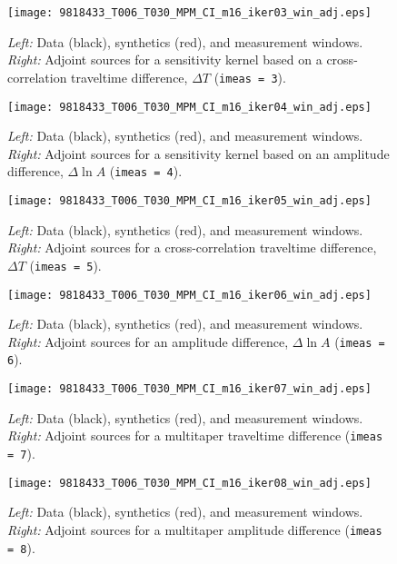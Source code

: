 \documentclass[11pt,titlepage,fleqn]{article}
\begin{document}
\begin{figure}
\texttt{[image: 9818433\_T006\_T030\_MPM\_CI\_m16\_iker03\_win\_adj.eps]}
\caption[]
{{
{\em Left:} Data (black), synthetics (red), and measurement windows.
{\em Right:} Adjoint sources for a sensitivity kernel based on a cross-correlation traveltime difference, $\Delta T$ ({\tt imeas = 3}).
\label{fig:iker03}
}}
\end{figure}


\begin{figure}
\texttt{[image: 9818433\_T006\_T030\_MPM\_CI\_m16\_iker04\_win\_adj.eps]}
\caption[]
{{
{\em Left:} Data (black), synthetics (red), and measurement windows.
{\em Right:} Adjoint sources for a sensitivity kernel based on an amplitude difference, $\Delta \ln A$ ({\tt imeas = 4}).
\label{fig:iker04}
}}
\end{figure}

\begin{figure}
\texttt{[image: 9818433\_T006\_T030\_MPM\_CI\_m16\_iker05\_win\_adj.eps]}
\caption[]
{{
{\em Left:} Data (black), synthetics (red), and measurement windows.
{\em Right:} Adjoint sources for a cross-correlation traveltime difference, $\Delta T$ ({\tt imeas = 5}).
\label{fig:iker05}
}}
\end{figure}

\begin{figure}
\texttt{[image: 9818433\_T006\_T030\_MPM\_CI\_m16\_iker06\_win\_adj.eps]}
\caption[]
{{
{\em Left:} Data (black), synthetics (red), and measurement windows.
{\em Right:} Adjoint sources for an amplitude difference, $\Delta \ln A$ ({\tt imeas = 6}).
\label{fig:iker06}
}}
\end{figure}

\begin{figure}
\texttt{[image: 9818433\_T006\_T030\_MPM\_CI\_m16\_iker07\_win\_adj.eps]}
\caption[]
{{
{\em Left:} Data (black), synthetics (red), and measurement windows.
{\em Right:} Adjoint sources for a multitaper traveltime difference ({\tt imeas = 7}).
\label{fig:iker07}
}}
\end{figure}

\begin{figure}
\texttt{[image: 9818433\_T006\_T030\_MPM\_CI\_m16\_iker08\_win\_adj.eps]}
\caption[]
{{
{\em Left:} Data (black), synthetics (red), and measurement windows.
{\em Right:} Adjoint sources for a multitaper amplitude difference ({\tt imeas = 8}).
\label{fig:iker08}
}}
\end{figure}

\end{document}
